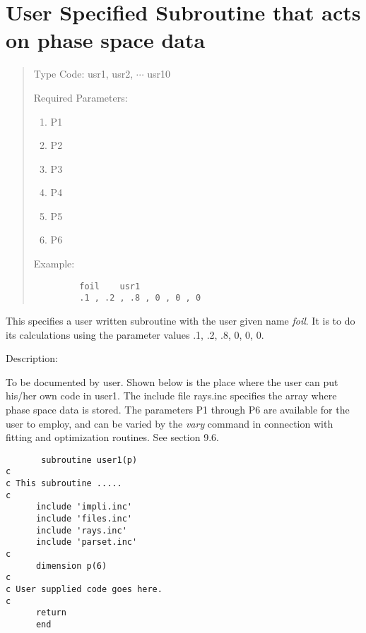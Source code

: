 \section{User Specified Subroutine that acts on phase space data}
\begin{quotation}
\noindent Type Code:  usr1, usr2, $\cdots$ usr10
\vspace{5mm}

\noindent Required Parameters:
\begin{enumerate}
      \item  P1
      \item  P2
      \item  P3
      \item  P4
      \item  P5
      \item  P6
\end{enumerate}

\vspace{5mm}
\noindent Example:
\begin{verbatim}
         foil    usr1
         .1 , .2 , .8 , 0 , 0 , 0
\end{verbatim}
\end{quotation}
This specifies a user written subroutine with the user given name {\em foil}.  It
is to do its calculations using the parameter values .1, .2, .8, 0, 0, 0.

\vspace{5mm}
     Description:
\vspace{2mm}

         To be documented by user.  Shown below is the place where the
		 user can put his/her own code in user1.  The include file rays.inc
		 specifies the array where phase space data is stored.  The parameters
		 P1 through P6 are available for the user to employ, and can be varied
		 by the {\em vary} command in connection with fitting and optimization
		 routines.  See section 9.6.

\begin{verbatim}
       subroutine user1(p)
c
c This subroutine .....
c
      include 'impli.inc'
      include 'files.inc'
      include 'rays.inc'
      include 'parset.inc'
c
      dimension p(6)
c
c User supplied code goes here.
c
      return
      end
\end{verbatim}

\newpage



